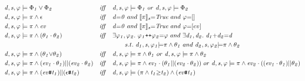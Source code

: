 \documentclass[acmsmall,10pt,review]{acmart}
\newcommand{\es}{\theta}
\newcommand{\ev}{ev}
\newcommand{\effect}{{\ensuremath{\mathrm{\Phi}}}}
\newcommand{\code}[1]{{\tt{\ensuremath{\m{#1}}}}}
\newcommand{\m}{\mathit}
\newcommand{\lappend}{\mathrel{\texttt{++}}}
\newcommand{\mysharp}{{\mathrel{\texttt{\#}}}}
\begin{document}
{\begin{figure}[!ht]
  \vspace{-3mm}
  \renewcommand{\arraystretch}{1.2}
\small\begin{align*}
&\code{d, s, \varphi \models \effect_1 \vee \effect_2}  
&\m{iff}\quad & \code{d, s, \varphi \models \effect_1 } \ 
or\ \code{d, s, \varphi \models \effect_2 }  \\
&\code{d, s,  \varphi \models {\pi} \wedge  \epsilon}  
&\m{iff}\quad & \code{d{=}0}\ and  \ \code{\llbracket {\pi} \rrbracket_s {=}  
{True} } \ and\  \code{ \varphi {=} [] }\\
&\code{d, s, \varphi \models {\pi} \wedge \ev }  
&\m{iff}\quad & \code{d{=}0}\ and  \ \code{\llbracket {\pi} \rrbracket_s {=}  
{True} }\ and \ \varphi {=} [\ev]  \\
&\code{d, s, \varphi \models {\pi} \wedge (\es_1\cdot \es_2)}  
&\m{iff}\quad & \exists \code{\varphi_1,\varphi_2}. \  
\code{ \varphi_1 {\lappend} \varphi_2 {=} \varphi}\ and\ 
\exists \code{d_1,d_2}. \  
\code{ d_1 {+} d_2 {=} d} \\
&&& \qquad  s.t. \ \code{d_1, s, \varphi_1 {\models} {\pi}  \wedge \es_1 }
\ and \ \code{d_2, s, \varphi_2 {\models} {\pi}  \wedge \es_2 }\\
&\code{d, s, \varphi \models {\pi} \wedge (\es_1{\vee}\es_2)}  
&\m{iff}\quad & 
\code{d, s, \varphi \models {\pi}  \wedge \es_1 } 
\ or\  
\code{d, s, \varphi \models {\pi}  \wedge \es_2 } \\
&\code{d, s, \varphi \models {\pi} \wedge (\ev_1 \cdot \es_1)||(\ev_2 \cdot \es_2)}  
&\m{iff}\quad & \code{d, s, \varphi \models {\pi}  \wedge \ev_1 \cdot  (\es_1||(\ev_2 \cdot \es_2)) } 
\ or\ \code{d, s, \varphi \models {\pi}  \wedge \ev_2 \cdot ((\ev_1 \cdot \es_1)||\es_2)  } \\
&\code{d, s, \varphi \models {\pi} \wedge (\ev\mysharp t_1) || (\epsilon \mysharp  t_2)}  
&\m{iff}\quad & \code{d, s, \varphi \models {(\pi \wedge t_1 {\geq}t_2)} \wedge (\ev\mysharp t_1) } 

\end{align*}
\end{figure}}
\end{document}

